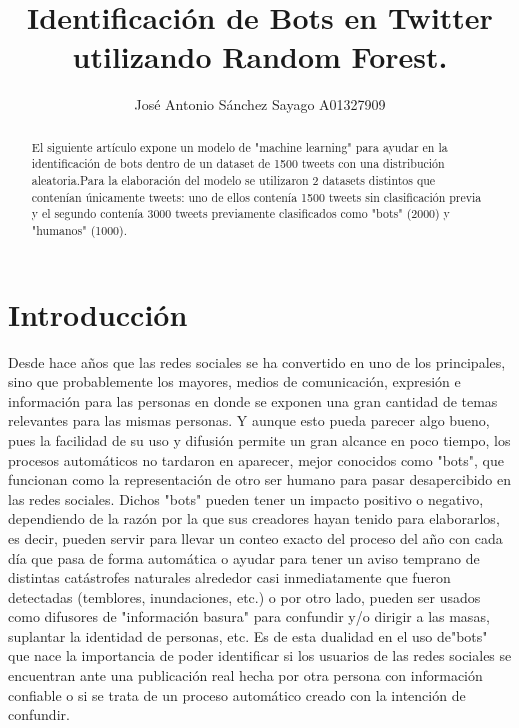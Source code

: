 \documentclass[runningheads]{llncs}
\begin{document}
%
\title{ Identificación de Bots en Twitter utilizando Random Forest.}
%
%
\author{José Antonio Sánchez Sayago A01327909}
%

%
%
\maketitle              %
%
\begin{abstract} 
El siguiente artículo expone un modelo de "machine learning" para ayudar en la identificación de bots dentro de un dataset de 1500 tweets con una distribución aleatoria.Para la elaboración del modelo se utilizaron 2 datasets distintos que contenían únicamente tweets: uno de ellos contenía 1500 tweets sin clasificación previa y el segundo contenía 3000 tweets previamente clasificados como "bots" (2000) y "humanos" (1000).

\end{abstract}
%
%
%
\section{Introducción}
Desde hace años que las redes sociales se ha convertido en uno de los principales, sino que probablemente los mayores, medios de comunicación, expresión e información para las personas en donde se exponen una gran cantidad de temas relevantes para las mismas personas. Y aunque esto pueda parecer algo bueno, pues la facilidad de su uso y difusión permite un gran alcance en poco tiempo, los procesos automáticos no tardaron en aparecer, mejor conocidos como "bots", que funcionan como la representación de otro ser humano para pasar desapercibido en las redes sociales. Dichos "bots" pueden tener un impacto positivo o negativo, dependiendo de la razón por la que sus creadores hayan tenido para elaborarlos, es decir, pueden servir para llevar un conteo exacto del proceso del año con cada día que pasa de forma automática o ayudar para tener un aviso temprano de distintas catástrofes naturales alrededor casi inmediatamente que fueron detectadas (temblores, inundaciones, etc.) o por otro lado, pueden ser usados como difusores de "información basura" para confundir y/o dirigir a las masas, suplantar la identidad de personas, etc.
Es de esta dualidad en el uso de"bots" que nace la importancia de poder identificar si los usuarios de las redes sociales se encuentran ante una publicación real hecha por otra persona con información confiable o si se trata de un proceso automático creado con la intención de confundir.
\end{document}
